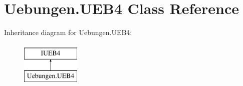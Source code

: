 \hypertarget{class_uebungen_1_1_u_e_b4}{}\section{Uebungen.\+U\+E\+B4 Class Reference}
\label{class_uebungen_1_1_u_e_b4}
Inheritance diagram for Uebungen.\+U\+E\+B4\+:\begin{figure}[H]
\begin{center}
\leavevmode
\includegraphics[height=2.000000cm]{class_uebungen_1_1_u_e_b4}
\end{center}
\end{figure}
